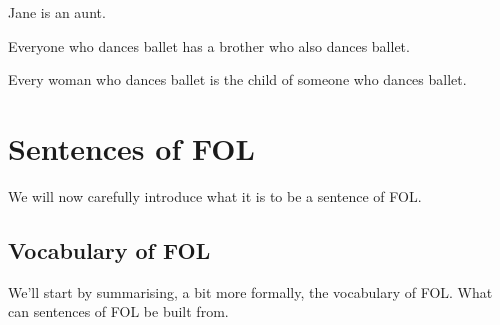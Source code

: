 \begin{practiceproblems}
\begin{earg}
\item Jane is an aunt.
\item[] 
\item Everyone who dances ballet has a brother who also dances ballet.
\item[] 
\item Every woman who dances ballet is the child of someone who dances ballet.
\item[] 
\end{earg}



\end{practiceproblems}


\chapter{Sentences of FOL}\label{s:FOLSentences}
We will now carefully introduce what it is to be a sentence of FOL.


\section{Vocabulary of FOL}
We'll start by summarising, a bit more formally, the vocabulary of FOL. What can sentences of FOL be built from.

